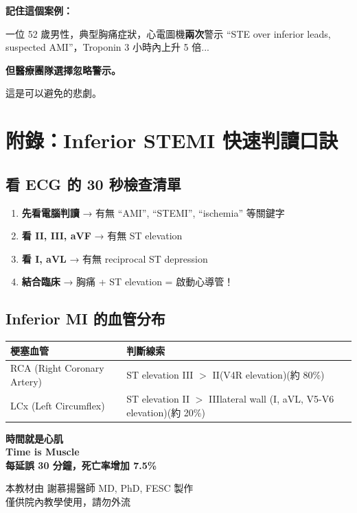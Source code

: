 \documentclass[12pt,a4paper]{article}
\begin{document}
\vspace{1cm}

\begin{learningbox}
\textbf{記住這個案例：}

一位 52 歲男性，典型胸痛症狀，心電圖機\textbf{兩次}警示 ``STE over inferior leads, suspected AMI''，Troponin 3 小時內上升 5 倍...

\textbf{但醫療團隊選擇忽略警示。}

這是可以避免的悲劇。
\end{learningbox}

\newpage
\section{附錄：Inferior STEMI 快速判讀口訣}

\subsection{看 ECG 的 30 秒檢查清單}

\begin{enumerate}[leftmargin=*]
\item \textbf{先看電腦判讀} → 有無 ``AMI'', ``STEMI'', ``ischemia'' 等關鍵字
\item \textbf{看 II, III, aVF} → 有無 ST elevation
\item \textbf{看 I, aVL} → 有無 reciprocal ST depression
\item \textbf{結合臨床} → 胸痛 + ST elevation = 啟動心導管！
\end{enumerate}

\subsection{Inferior MI 的血管分布}

\begin{longtable}{p{4cm}p{10cm}}
\toprule
\textbf{梗塞血管} & \textbf{判斷線索} \\
\midrule
\endhead
RCA (Right Coronary Artery) & ST elevation III $>$ II (V4R elevation) (約 80\%) \\
\midrule
LCx (Left Circumflex) & ST elevation II $>$ III lateral wall (I, aVL, V5-V6 elevation) (約 20\%) \\
\bottomrule
\end{longtable}

\vspace{2cm}

\begin{center}
\Large\bfseries\color{emergency_red}
時間就是心肌\\
Time is Muscle\\
\vspace{0.5cm}
\normalsize\color{black}
每延誤 30 分鐘，死亡率增加 7.5\%
\end{center}

\vfill

\begin{center}
\small
本教材由 謝慕揚醫師 MD, PhD, FESC 製作\\
僅供院內教學使用，請勿外流
\end{center}
\end{document}
